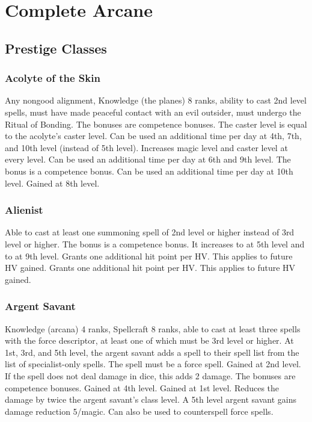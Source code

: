 \section{Complete Arcane}
\subsection{Prestige Classes}
\subsubsection{Acolyte of the Skin}
 Any nongood alignment, Knowledge (the planes) 8 ranks, ability to cast 2nd level spells, must have made peaceful contact with an evil outsider, must undergo the Ritual of Bonding.
 The bonuses are competence bonuses.
 The caster level is equal to the acolyte's caster level. Can be used an additional time per day at 4th, 7th, and 10th level (instead of 5th level).
 Increases magic level and caster level at every level.
 Can be used an additional time per day at 6th and 9th level.
 The bonus is a competence bonus.
 Can be used an additional time per day at 10th level.
 Gained at 8th level.
\subsubsection{Alienist}
 Able to cast at least one summoning spell of 2nd level or higher instead of 3rd level or higher.
 The bonus is a competence bonus. It increases to  at 5th level and to  at 9th level.
 Grants one additional hit point per HV. This applies to future HV gained.
 Grants one additional hit point per HV. This applies to future HV gained.
\subsubsection{Argent Savant}
 Knowledge (arcana) 4 ranks, Spellcraft 8 ranks, able to cast at least three spells with the force descriptor, at least one of which must be 3rd level or higher.
 At 1st, 3rd, and 5th level, the argent savant adds a spell to their spell list from the list of specialist-only spells. The spell must be a force spell.
 Gained at 2nd level. If the spell does not deal damage in dice, this adds 2 damage. The bonuses are competence bonuses.
 Gained at 4th level.
 Gained at 1st level. Reduces the damage by twice the argent savant's class level.
 A 5th level argent savant gains damage reduction 5/magic.
 Can also be used to counterspell force spells.
